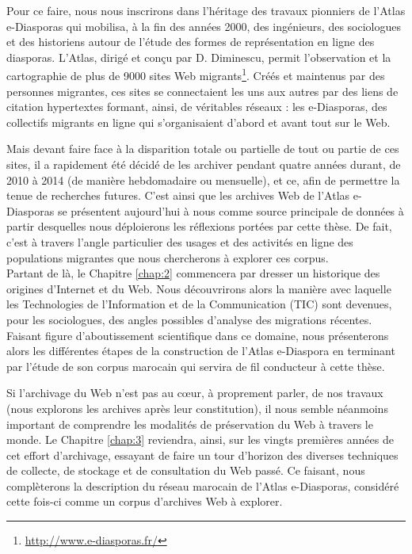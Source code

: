 \documentclass[symmetric,justified,marginals=raggedouter]{tufte-book}
\begin{document}
Pour ce faire, nous nous inscrirons dans l'héritage des travaux pionniers de l'Atlas e-Diasporas \citep{diminescu_e-diasporas_2012} qui mobilisa, à la fin des années 2000, des ingénieurs, des sociologues et des historiens autour de l'étude des formes de représentation en ligne des diasporas. L'Atlas, dirigé et conçu par D. Diminescu, permit l'observation et la cartographie de plus de 9000 sites Web migrants\footnote{\RaggedOuter \url{http://www.e-diasporas.fr/}}. Créés et maintenus par des personnes migrantes, ces sites se connectaient les uns aux autres par des liens de citation hypertextes formant, ainsi, de véritables réseaux : les e-Diasporas, des collectifs migrants en ligne qui s'organisaient d'abord et avant tout sur le Web. 

Mais devant faire face à la disparition totale ou partielle de tout ou partie de ces sites, il a rapidement été décidé de les archiver pendant quatre années durant, de 2010 à 2014 (de manière hebdomadaire ou mensuelle), et ce, afin de permettre la tenue de recherches futures. C'est ainsi que les archives Web de l'Atlas e-Diasporas se présentent aujourd'hui à nous comme source principale de données à partir desquelles nous déploierons les réflexions portées par cette thèse. De fait, c'est à travers l'angle particulier des usages et des activités en ligne des populations migrantes que nous chercherons à explorer ces corpus. \\

\noindent Partant de là, le Chapitre \ref{chap:2} commencera par dresser un historique des origines d'Internet et du Web. Nous découvrirons alors la manière avec laquelle les Technologies de l'Information et de la Communication (TIC) sont devenues, pour les sociologues, des angles possibles d'analyse des migrations récentes. Faisant figure d'aboutissement scientifique dans ce domaine, nous présenterons alors les différentes étapes de la construction de l'Atlas e-Diaspora en terminant par l'étude de son corpus marocain qui servira de fil conducteur à cette thèse.

Si l'archivage du Web n'est pas au cœur, à proprement parler, de nos travaux (nous explorons les archives après leur constitution), il nous semble néanmoins important de comprendre les modalités de préservation du Web à travers le monde. Le Chapitre \ref{chap:3} reviendra, ainsi, sur les vingts premières années de cet effort d'archivage, essayant de faire un tour d'horizon des diverses techniques de collecte, de stockage et de consultation du Web passé. Ce faisant, nous complèterons la description du réseau marocain de l'Atlas e-Diasporas, considéré cette fois-ci comme un corpus d'archives Web à explorer.    
\end{document}
